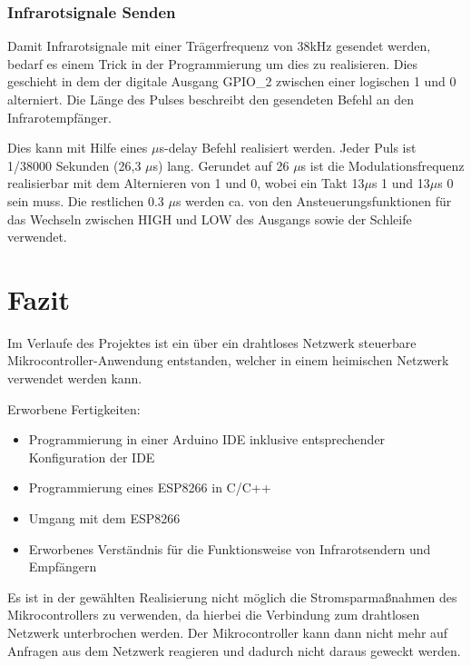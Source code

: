 \subsubsection{Infrarotsignale Senden}
Damit Infrarotsignale mit einer Trägerfrequenz von 38kHz gesendet werden, bedarf es einem Trick in der Programmierung um dies zu realisieren.
Dies geschieht in dem der digitale Ausgang \acs{GPIO}\_2 zwischen einer logischen 1 und 0 alterniert.
Die Länge des Pulses beschreibt den gesendeten Befehl an den Infrarotempfänger.

Dies kann mit Hilfe eines $\mu$s-delay Befehl realisiert werden.
Jeder Puls ist 1/38000 Sekunden (26,3 $\mu$s) lang. 
Gerundet auf 26 $\mu$s ist die Modulationsfrequenz realisierbar mit dem Alternieren von 1 und 0, wobei ein Takt 13$\mu$s 1 und 13$\mu$s 0 sein muss.
Die restlichen 0.3 $\mu$s werden ca. von den Ansteuerungsfunktionen für das Wechseln zwischen HIGH und LOW des Ausgangs sowie der Schleife verwendet.

\section{Fazit}

Im Verlaufe des Projektes ist ein über ein drahtloses Netzwerk steuerbare Mikrocontroller-Anwendung entstanden, welcher in einem heimischen Netzwerk verwendet werden kann.

Erworbene Fertigkeiten:
\begin{itemize}
	\item Programmierung in einer Arduino \acs{IDE} inklusive entsprechender Konfiguration der \acs{IDE}
	\item Programmierung eines ESP8266 in C/C++
	\item Umgang mit dem ESP8266
	\item Erworbenes Verständnis für die Funktionsweise von Infrarotsendern und Empfängern
\end{itemize} 

Es ist in der gewählten Realisierung nicht möglich die Stromsparmaßnahmen des Mikrocontrollers zu verwenden, da hierbei die Verbindung zum drahtlosen Netzwerk unterbrochen werden. Der Mikrocontroller kann dann nicht mehr auf Anfragen aus dem Netzwerk reagieren und dadurch nicht daraus geweckt werden.

